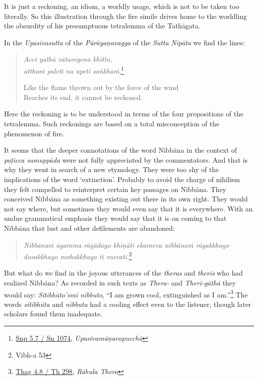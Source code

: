 It is just a reckoning, an idiom, a worldly usage, which is not to be taken too literally. So this illustration through the fire simile drives home to the worldling the absurdity of his presumptuous tetralemma of the Tathāgata.

In the \emph{Upasīvasutta} of the \emph{Pārāyaṇavagga} of the \emph{Sutta Nipāta} we find the lines:

\begin{quote}
\emph{Accī yathā vātavegena khitto,}\\
\emph{atthaṁ paleti na upeti saṅkhaṁ},\footnote{\href{https://suttacentral.net/snp5.7/pli/ms}{Snp 5.7 / Sn 1074}, \emph{Upasīvamāṇavapucchā}}

Like the flame thrown out by the force of the wind\\
Reaches its end, it cannot be reckoned.
\end{quote}

Here the reckoning is to be understood in terms of the four propositions of the tetralemma. Such reckonings are based on a total misconception of the phenomenon of fire.

It seems that the deeper connotations of the word Nibbāna in the context of \emph{paṭicca samuppāda} were not fully appreciated by the commentators. And that is why they went in search of a new etymology. They were too shy of the implications of the word `extinction'. Probably to avoid the charge of nihilism they felt compelled to reinterpret certain key passages on Nibbāna. They conceived Nibbāna as something existing out there in its own right. They would not say where, but sometimes they would even say that it is everywhere. With an undue grammatical emphasis they would say that it is on coming to that Nibbāna that lust and other defilements are abandoned:

\begin{quote}
\emph{Nibbānaṁ āgamma rāgādayo khīṇāti ekameva nibbānaṁ rāgakkhayo dosakkhayo mohakkhayo ti vuccati.}\footnote{Vibh-a 53}
\end{quote}

But what do we find in the joyous utterances of the \emph{theras} and \emph{therīs} who had realized Nibbāna? As recorded in such texts as \emph{Thera-} and \emph{Therī-gāthā} they would say: \emph{Sītibhūto'smi nibbuto}, ``I am grown cool, extinguished as I am.''\footnote{\href{https://suttacentral.net/thag4.8/pli/ms}{Thag 4.8 / Th 298}, \emph{Rāhula Thera}} The words \emph{sītibhūta} and \emph{nibbuta} had a cooling effect even to the listener, though later scholars found them inadequate.

